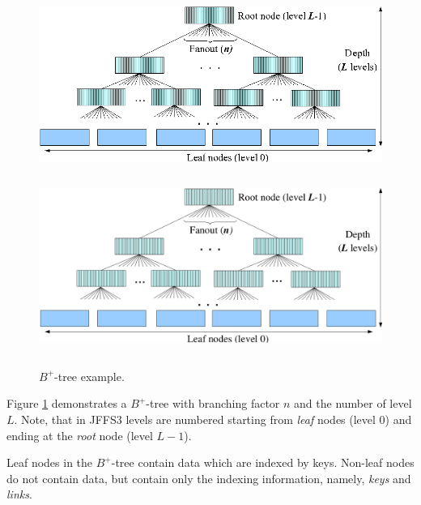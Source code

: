 \documentclass[12pt,a4paper,oneside,titlepage]{article}
\begin{document}
%
%
\begin{figure}[h]
\begin{center}
\begin{htmlonly}
\includegraphics{pics/btree-01.png}
\end{htmlonly}
\includegraphics[width=159mm,height=65mm]{pics/btree-01.pdf}
\end{center}
\caption{$B^+$-tree example.}
\label{ref_FigureBTree_01}
\end{figure}

Figure \ref{ref_FigureBTree_01} demonstrates a \mbox{$B^+$-tree} with branching
factor $n$ and the number of level $L$. Note, that in JFFS3 levels are numbered
starting from \emph{leaf} nodes (level 0) and ending at the \emph{root} node
(level $L-1$).

Leaf nodes in the \mbox{$B^+$-tree} contain data which are indexed by
keys. \mbox{Non-leaf} nodes do not contain data, but contain only the indexing
information, namely, \emph{keys} and \emph{links}.
\end{document}
